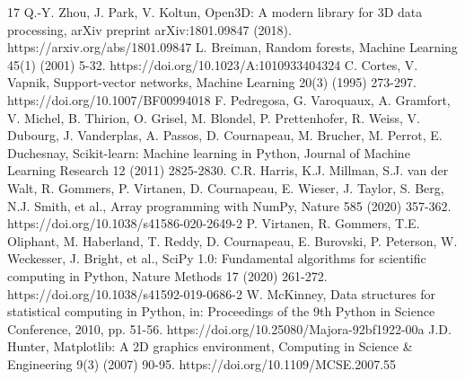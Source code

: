 \documentclass[3p]{elsarticle}
\begin{document}
\begin{thebibliography}{17}
Q.-Y. Zhou, J. Park, V. Koltun, Open3D: A modern library for 3D data processing, arXiv preprint arXiv:1801.09847 (2018). https://arxiv.org/abs/1801.09847
L. Breiman, Random forests, Machine Learning 45(1) (2001) 5-32. https://doi.org/10.1023/A:1010933404324
C. Cortes, V. Vapnik, Support-vector networks, Machine Learning 20(3) (1995) 273-297. https://doi.org/10.1007/BF00994018
F. Pedregosa, G. Varoquaux, A. Gramfort, V. Michel, B. Thirion, O. Grisel, M. Blondel, P. Prettenhofer, R. Weiss, V. Dubourg, J. Vanderplas, A. Passos, D. Cournapeau, M. Brucher, M. Perrot, E. Duchesnay, Scikit-learn: Machine learning in Python, Journal of Machine Learning Research 12 (2011) 2825-2830.
C.R. Harris, K.J. Millman, S.J. van der Walt, R. Gommers, P. Virtanen, D. Cournapeau, E. Wieser, J. Taylor, S. Berg, N.J. Smith, et al., Array programming with NumPy, Nature 585 (2020) 357-362. https://doi.org/10.1038/s41586-020-2649-2
P. Virtanen, R. Gommers, T.E. Oliphant, M. Haberland, T. Reddy, D. Cournapeau, E. Burovski, P. Peterson, W. Weckesser, J. Bright, et al., SciPy 1.0: Fundamental algorithms for scientific computing in Python, Nature Methods 17 (2020) 261-272. https://doi.org/10.1038/s41592-019-0686-2
W. McKinney, Data structures for statistical computing in Python, in: Proceedings of the 9th Python in Science Conference, 2010, pp. 51-56. https://doi.org/10.25080/Majora-92bf1922-00a
J.D. Hunter, Matplotlib: A 2D graphics environment, Computing in Science \& Engineering 9(3) (2007) 90-95. https://doi.org/10.1109/MCSE.2007.55
\end{thebibliography}
\end{document}
